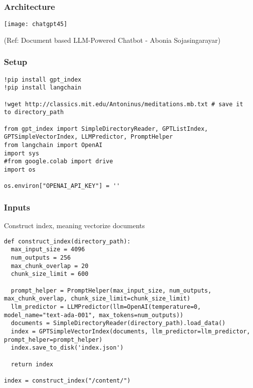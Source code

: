 \begin{frame}[fragile]\frametitle{Architecture}

\begin{center}
\texttt{[image: chatgpt45]}

{\tiny (Ref: Document based LLM-Powered Chatbot - Abonia Sojasingarayar)}

\end{center}		


\end{frame}


\begin{frame}[fragile]\frametitle{Setup}


\begin{lstlisting}
!pip install gpt_index
!pip install langchain

!wget http://classics.mit.edu/Antoninus/meditations.mb.txt # save it to directory_path

from gpt_index import SimpleDirectoryReader, GPTListIndex, GPTSimpleVectorIndex, LLMPredictor, PromptHelper
from langchain import OpenAI
import sys
#from google.colab import drive
import os

os.environ["OPENAI_API_KEY"] = ''
\end{lstlisting}



\end{frame}

\begin{frame}[fragile]\frametitle{Inputs}

Construct index, meaning vectorize documents

\begin{lstlisting}
def construct_index(directory_path):
  max_input_size = 4096
  num_outputs = 256
  max_chunk_overlap = 20
  chunk_size_limit = 600

  prompt_helper = PromptHelper(max_input_size, num_outputs, max_chunk_overlap, chunk_size_limit=chunk_size_limit)
  llm_predictor = LLMPredictor(llm=OpenAI(temperature=0, model_name="text-ada-001", max_tokens=num_outputs))
  documents = SimpleDirectoryReader(directory_path).load_data()
  index = GPTSimpleVectorIndex(documents, llm_predictor=llm_predictor, prompt_helper=prompt_helper)
  index.save_to_disk('index.json')

  return index
	
index = construct_index("/content/")
\end{lstlisting}

\end{frame}

